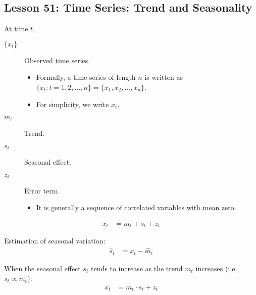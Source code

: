 \documentclass[10pt, french]{article}\usepackage[]{graphicx}\usepackage[]{color}
\def\SectionColor{cobalt}
\begin{document}
\begin{multicols*}{2}
\pagebreak

\def\SectionColor{blue!80!white}
\section{Lesson 51: Time Series: Trend and Seasonality}
\begin{distributions}[Notation]
At time $t$,
\begin{description}
	\item[$\{x_{t}\}$]	Observed time series.
		\begin{itemize}
		\item	Formally, a time series of length $n$ is written as $\{x_{t}: t	=	1, 2, \dots, n\}	=	\{x_{1}, x_{2}, \dots, x_{n}\}$.
		\item	For simplicity, we write $x_{t}$.
		\end{itemize}
	\item[$m_{t}$]	Trend.
	\item[$s_{t}$]	Seasonal effect.
	\item[$z_{t}$]	Error term.
		\begin{itemize}
		\item	It is generally a sequence of correlated variables with mean zero.
		\end{itemize}
\end{description}
\end{distributions}

\begin{definitionNOHFILLsub}
\begin{align*}
	x_{t}
	&=	m_{t} + s_{t} + z_{t}
\end{align*}

\tcbline

Estimation of seasonal variation:
\begin{align*}
	\hat{s}_{t}
	&=	x_{t}	-	\hat{m}_{t}
\end{align*}
\end{definitionNOHFILLsub}

\begin{definitionNOHFILLsub}
When the seasonal effect $s_{t}$ tends to increase as the trend $m_{t}$ increases (i.e., $s_{t} \propto m_{t}$):
\begin{align*}
	x_{t}
	&=	m_{t} \cdot s_{t} + z_{t}
\end{align*}

\tcbline


\end{definitionNOHFILLsub}
\end{multicols*}
\end{document}

